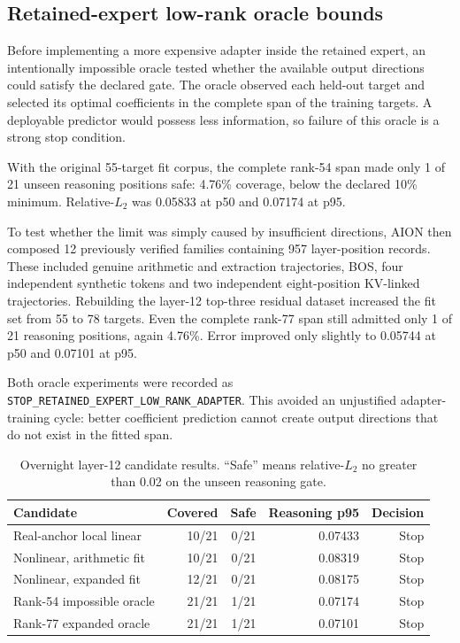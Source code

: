 \subsection{Retained-expert low-rank oracle bounds}

Before implementing a more expensive adapter inside the retained expert, an
intentionally impossible oracle tested whether the available output directions
could satisfy the declared gate.  The oracle observed each held-out target and
selected its optimal coefficients in the complete span of the training
targets.  A deployable predictor would possess less information, so failure of
this oracle is a strong stop condition.

With the original 55-target fit corpus, the complete rank-54 span made only
1 of 21 unseen reasoning positions safe: 4.76\% coverage, below the declared
10\% minimum.  Relative-$L_2$ was 0.05833 at p50 and 0.07174 at p95.

To test whether the limit was simply caused by insufficient directions, AION
then composed 12 previously verified families containing 957 layer-position
records.  These included genuine arithmetic and extraction trajectories, BOS,
four independent synthetic tokens and two independent eight-position
KV-linked trajectories.  Rebuilding the layer-12 top-three residual dataset
increased the fit set from 55 to 78 targets.  Even the complete rank-77 span
still admitted only 1 of 21 reasoning positions, again 4.76\%.  Error improved
only slightly to 0.05744 at p50 and 0.07101 at p95.

Both oracle experiments were recorded as
\texttt{STOP\_RETAINED\_EXPERT\_LOW\_RANK\_ADAPTER}.  This avoided an
unjustified adapter-training cycle: better coefficient prediction cannot
create output directions that do not exist in the fitted span.

\begin{table}[htbp]
\centering
\small
\caption{Overnight layer-12 candidate results.  ``Safe'' means relative-$L_2$
no greater than 0.02 on the unseen reasoning gate.}
\label{tab:gptoss120b-overnight-candidates}
\begin{tabularx}{\textwidth}{@{}Xrrrr@{}}
\toprule
Candidate & Covered & Safe & Reasoning p95 & Decision \\
\midrule
Real-anchor local linear & 10/21 & 0/21 & 0.07433 & Stop \\
Nonlinear, arithmetic fit & 10/21 & 0/21 & 0.08319 & Stop \\
Nonlinear, expanded fit & 12/21 & 0/21 & 0.08175 & Stop \\
Rank-54 impossible oracle & 21/21 & 1/21 & 0.07174 & Stop \\
Rank-77 expanded oracle & 21/21 & 1/21 & 0.07101 & Stop \\
\bottomrule
\end{tabularx}
\end{table}

